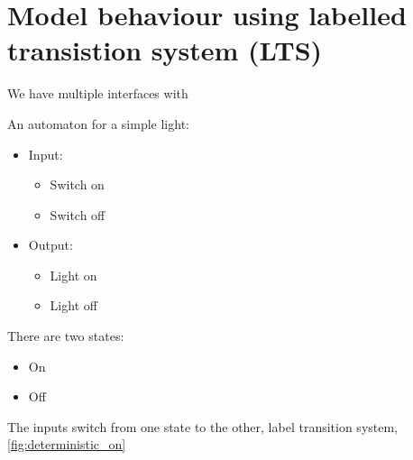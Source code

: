 
\section{Model behaviour using labelled transistion system (LTS)}

We have multiple interfaces with

An automaton for a simple light:
\begin{itemize}
  \item Input:
  \begin{itemize}
    \item Switch on
    \item Switch off
  \end{itemize}
  \item Output:
  \begin{itemize}
    \item Light on
    \item Light off
  \end{itemize}
\end{itemize}

There are two states:
\begin{itemize}
  \item On
  \item Off
\end{itemize}

The inputs switch from one state to the other, label transition system, 
\autoref{fig:deterministic_on}

